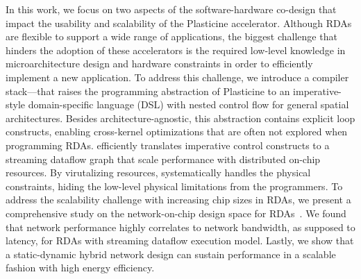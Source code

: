 In this work, we focus on two aspects of the software-hardware co-design that impact the usability
and scalability of the Plasticine accelerator. 
Although RDAs are flexible to support a wide range of applications, 
the biggest challenge that hinders the adoption of these accelerators is 
the required low-level knowledge in microarchitecture design and hardware constraints in
order to efficiently implement a new application.
To address this challenge, we introduce a compiler stack--\name--that raises the programming abstraction of
Plasticine to an imperative-style domain-specific language (DSL) with nested control
flow for general spatial architectures.
Besides architecture-agnostic, this abstraction contains explicit loop constructs, enabling cross-kernel optimizations that are often not explored when programming RDAs.
\name efficiently translates imperative control constructs to a streaming
dataflow graph that scale performance with distributed on-chip resources.
By virutalizing resources, \name systematically handles the physical constraints, hiding
the low-level physical limitations from the programmers.
To address the scalability challenge with increasing chip sizes in RDAs, 
we present a comprehensive study on the network-on-chip design space for RDAs~\cite{network}.
We found that network performance highly correlates to network bandwidth, as supposed to latency,
for RDAs with streaming dataflow execution model.
Lastly, we show that a static-dynamic hybrid network design can sustain performance in a 
scalable fashion with high energy efficiency.
